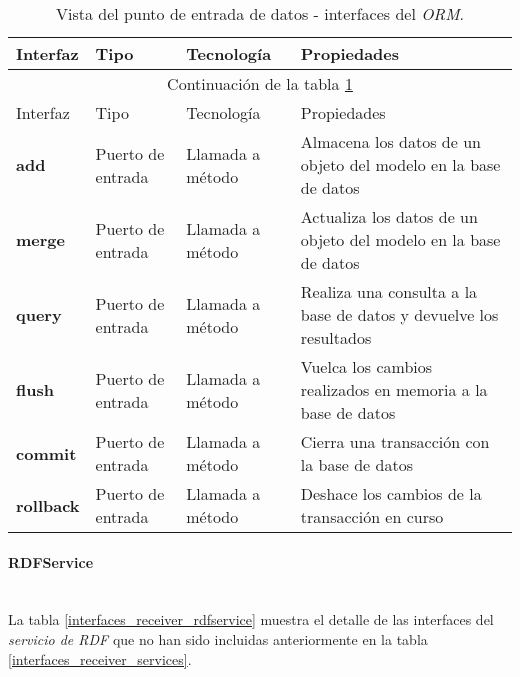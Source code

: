 \begin{longtable}[c]{|p{25mm}|p{20mm}|p{30mm}|p{60mm}|}
	\caption{Vista del punto de entrada de datos - interfaces del \textit{ORM}.\label{interfaces_receiver_orm}}\\
		\hline
			Interfaz & Tipo & Tecnología & Propiedades\\
		\hline
		\hline
	\endfirsthead
		\hline
		\multicolumn{4}{|c|}{Continuación de la tabla \ref{interfaces_receiver_orm}}\\
		\hline
			Interfaz & Tipo & Tecnología & Propiedades\\
		\hline
		\hline
	\endhead
	\hline
	\endfoot
		\textbf{add} & Puerto de entrada & Llamada a método & Almacena los datos de un objeto del modelo en la base de datos \\
		\hline
		\textbf{merge} & Puerto de entrada & Llamada a método & Actualiza los datos de un objeto del modelo en la base de datos \\
		\hline
		\textbf{query} & Puerto de entrada & Llamada a método & Realiza una consulta a la base de datos y devuelve los resultados\\
		\hline
		\textbf{flush} & Puerto de entrada & Llamada a método & Vuelca los cambios realizados en memoria a la base de datos \\
		\hline
		\textbf{commit} & Puerto de entrada & Llamada a método & Cierra una transacción con la base de datos \\
		\hline
		\textbf{rollback} & Puerto de entrada & Llamada a método & Deshace los cambios de la transacción en curso\\
		\hline
	\hline
	\hline
\end{longtable}


\paragraph{RDFService} \hfill \\
La tabla \ref{interfaces_receiver_rdfservice} muestra el detalle de las interfaces del \textit{servicio de RDF} que no han sido incluidas anteriormente en la tabla \ref{interfaces_receiver_services}.  

